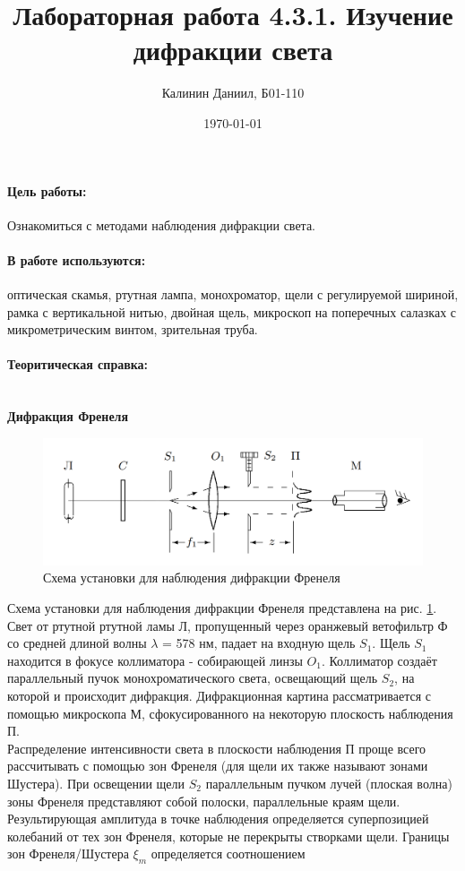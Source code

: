 \documentclass[a4paper, 12pt]{article}
\author{Калинин Даниил, Б01-110}
\date{\today}
\title{Лабораторная работа 4.3.1. Изучение дифракции света}
\newcommand{\parag}[1]{\paragraph*{#1:}}
\begin{document}
\maketitle
\parindent=0cm

\parag {Цель работы}
Ознакомиться с методами наблюдения 
дифракции света.

\parag {В работе используются}
оптическая скамья, ртутная лампа, монохроматор, щели с регулируемой шириной, рамка с вертикальной нитью, двойная щель, микроскоп на поперечных салазках с микрометрическим винтом, зрительная труба.

\parag {Теоритическая справка} ~\\

\textbf{Дифракция Френеля}~\\
    \begin{figure}
        \centering
        \includegraphics[width=0.6\linewidth]{fren_setup.png}
        \caption{Схема установки для наблюдения дифракции Френеля}
        \label{fig:fren_setup}
    \end{figure}

    Схема установки для наблюдения дифракции Френеля представлена на рис. \ref{fig:fren_setup}. Свет от ртутной ртутной ламы Л, пропущенный через оранжевый  ветофильтр Ф со средней длиной волны $\lambda$ = 578 нм, падает на входную щель $S_1$. Щель $S_1$ находится в фокусе коллиматора - собирающей линзы $O_1$. Коллиматор создаёт параллельный пучок монохроматического света, освещающий щель $S_2$, на которой и происходит дифракция. Дифракционная картина рассматривается с помощью микроскопа М, сфокусированного на некоторую плоскость наблюдения П.\\
    
    Распределение интенсивности света в плоскости наблюдения П проще всего рассчитывать с помощью зон Френеля (для щели их также называют зонами Шустера). При освещении щели $S_2$ параллельным пучком лучей (плоская волна) зоны Френеля представляют собой полоски, параллельные краям щели. Результирующая амплитуда в точке наблюдения определяется суперпозицией колебаний от тех зон Френеля, которые не перекрыты створками щели. Границы зон Френеля/Шустера $\xi_m$ определяется соотношением
\end{document}
